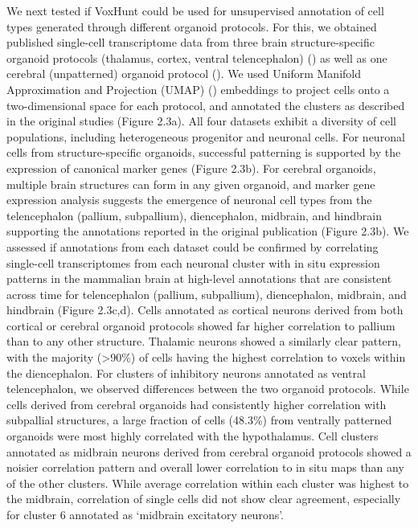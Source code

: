 We next tested if VoxHunt could be used for unsupervised annotation of cell types generated through different organoid protocols. For this, we obtained published single-cell transcriptome data from three brain structure-specific organoid protocols (thalamus, cortex, ventral telencephalon) (\cite{birey_assembly_2017,xiang_hesc-derived_2019}) as well as one cerebral (unpatterned) organoid protocol (\cite{kanton_organoid_2019}). We used Uniform Manifold Approximation and Projection (UMAP) (\cite{becht_dimensionality_2019}) embeddings to project cells onto a two-dimensional space for each protocol, and annotated the clusters as described in the original studies (Figure 2.3a). All four datasets exhibit a diversity of cell populations, including heterogeneous progenitor and neuronal cells. For neuronal cells from structure-specific organoids, successful patterning is supported by the expression of canonical marker genes (Figure 2.3b). For cerebral organoids, multiple brain structures can form in any given organoid, and marker gene expression analysis suggests the emergence of neuronal cell types from the telencephalon (pallium, subpallium), diencephalon, midbrain, and hindbrain supporting the annotations reported in the original publication (Figure 2.3b). We assessed if annotations from each dataset could be confirmed by correlating single-cell transcriptomes from each neuronal cluster with in situ expression patterns in the mammalian brain at high-level annotations that are consistent across time for telencephalon (pallium, subpallium), diencephalon, midbrain, and hindbrain (Figure 2.3c,d). Cells annotated as cortical neurons derived from both cortical or cerebral organoid protocols showed far higher correlation to pallium than to any other structure. Thalamic neurons showed a similarly clear pattern, with the majority (>90\%) of cells having the highest correlation to voxels within the diencephalon. For clusters of inhibitory neurons annotated as ventral telencephalon, we observed differences between the two organoid protocols. While cells derived from cerebral organoids had consistently higher correlation with subpallial structures, a large fraction of cells (48.3\%) from ventrally patterned organoids were most highly correlated with the hypothalamus. Cell clusters annotated as midbrain neurons derived from cerebral organoid protocols showed a noisier correlation pattern and overall lower correlation to in situ maps than any of the other clusters. While average correlation within each cluster was highest to the midbrain, correlation of single cells did not show clear agreement, especially for cluster 6 annotated as ‘midbrain excitatory neurons’.

